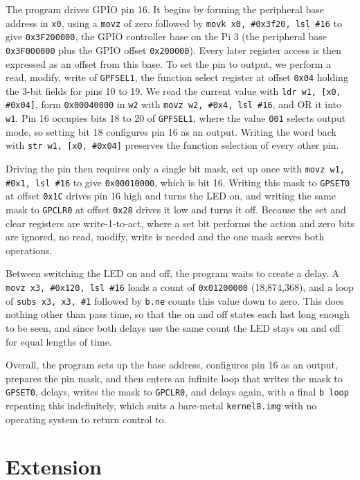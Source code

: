 \documentclass[11pt]{article}
\newcommand{\code}[1]{\texttt{#1}}
\begin{document}
The program drives GPIO pin 16. It begins by forming the peripheral base address in \code{x0}, using a \code{movz} of zero followed by \code{movk x0, \#0x3f20, lsl \#16} to give \code{0x3F200000}, the GPIO controller base on the Pi 3 (the peripheral base \code{0x3F000000} plus the GPIO offset \code{0x200000}). Every later register access is then expressed as an offset from this base. To set the pin to output, we perform a read, modify, write of \code{GPFSEL1}, the function select register at offset \code{0x04} holding the 3-bit fields for pins 10 to 19. We read the current value with \code{ldr w1, [x0, \#0x04]}, form \code{0x00040000} in \code{w2} with \code{movz w2, \#0x4, lsl \#16}, and OR it into \code{w1}. Pin 16 occupies bits 18 to 20 of \code{GPFSEL1}, where the value \code{001} selects output mode, so setting bit 18 configures pin 16 as an output. Writing the word back with \code{str w1, [x0, \#0x04]} preserves the function selection of every other pin.

Driving the pin then requires only a single bit mask, set up once with \code{movz w1, \#0x1, lsl \#16} to give \code{0x00010000}, which is bit 16. Writing this mask to \code{GPSET0} at offset \code{0x1C} drives pin 16 high and turns the LED on, and writing the same mask to \code{GPCLR0} at offset \code{0x28} drives it low and turns it off. Because the set and clear registers are write-1-to-act, where a set bit performs the action and zero bits are ignored, no read, modify, write is needed and the one mask serves both operations.

Between switching the LED on and off, the program waits to create a delay. A \code{movz x3, \#0x120, lsl \#16} loads a count of \code{0x01200000} (18,874,368), and a loop of \code{subs x3, x3, \#1} followed by \code{b.ne} counts this value down to zero. This does nothing other than pass time, so that the on and off states each last long enough to be seen, and since both delays use the same count the LED stays on and off for equal lengths of time.

Overall, the program sets up the base address, configures pin 16 as an output, prepares the pin mask, and then enters an infinite loop that writes the mask to \code{GPSET0}, delays, writes the mask to \code{GPCLR0}, and delays again, with a final \code{b loop} repeating this indefinitely, which suits a bare-metal \code{kernel8.img} with no operating system to return control to.

\section{Extension}
\end{document}
